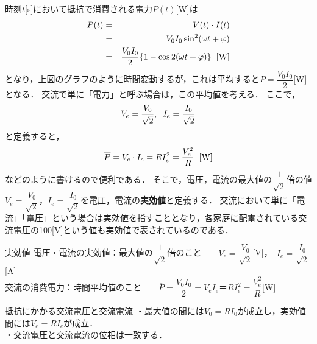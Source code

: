 時刻$t$[s]において抵抗で消費される電力$P(t)$[W]は
\begin{eqnarray*}
P(t)&=&V(t)\cdot I(t)\\
&=&V_0I_0\sin ^2(\omega t+\varphi)\\
&=&\dfrac{V_0I_0}{2}\{ 1-\cos 2(\omega t+\varphi)\} \hspace{2mm} [{\rm W}]
\end{eqnarray*}
となり，上図のグラフのように時間変動するが，これは平均すると$\overline{P}=\dfrac{V_0I_0}{2} $[W]となる．
交流で単に「電力」と呼ぶ場合は，この平均値を考える．
ここで，
\[V_e=\dfrac{V_0}{\sqrt 2}, \hspace{2mm} I_e=\dfrac{I_0}{\sqrt 2}\]
と定義すると，
\[\overline{P}=V_e\cdot I_e=RI_e^2=\dfrac{V_e^2}{R} \hspace{2mm} [{\rm W}]\]
などのように書けるので便利である．
そこで，電圧，電流の最大値の$\dfrac{1}{\sqrt2}$倍の値$V_e=\dfrac{V_0}{\sqrt2}$，$I_e=\dfrac{I_0}{\sqrt2}$を電圧，電流の{\bf 実効値}と定義する．
交流において単に「電流」「電圧」という場合は実効値を指すこととなり，各家庭に配電されている交流電圧の100[V]という値も実効値で表されているのである．

\begin{matome}{実効値}
 \hspace{3mm} 電圧・電流の実効値：最大値の$\dfrac{1}{\sqrt2}$倍のこと　　$V_e=\dfrac{V_0}{\sqrt2}$\hspace{2mm}[V]，　$I_e=\dfrac{I_0}{\sqrt2}$\hspace{2mm}[A]\\
 \hspace{3mm} 交流の消費電力：時間平均値のこと　　$\overline{P}=\dfrac{V_0I_0}{2} =V_e I_e＝RI_e^2=\dfrac{V_e^2}{R}$\hspace{2mm}[W]
\end{matome}

\begin{matome}{抵抗にかかる交流電圧と交流電流}
 \hspace{3mm} ・最大値の間には$V_0=RI_0$が成立し，実効値間には$V_e=RI_e$が成立．\\
 \hspace{3mm} ・交流電圧と交流電流の位相は一致する．
\end{matome}

